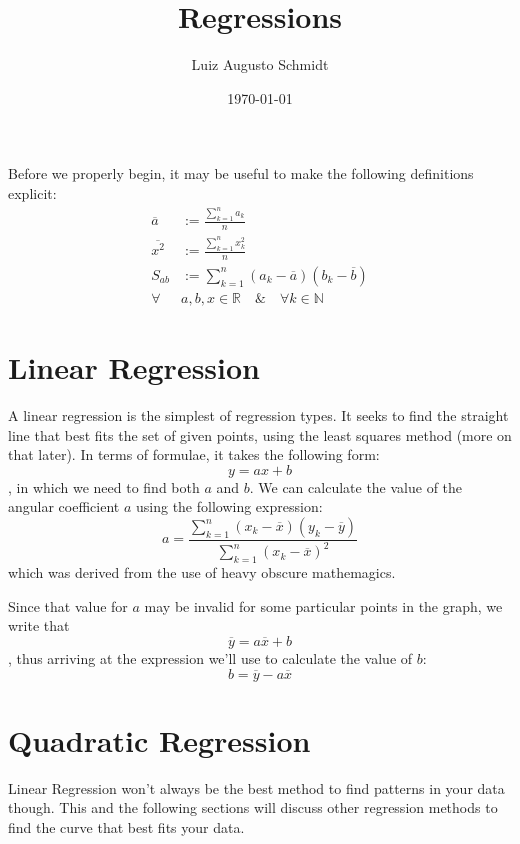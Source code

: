 \documentclass{article}
\title{Regressions}
\author{Luiz Augusto Schmidt}
\date{\today}
\begin{document}
	\maketitle
	Before we properly begin, it may be useful to make the following definitions explicit:
		\begin{equation*}
			\begin{split}
				\overline{a} &:= \frac{\sum_{k=1}^{n} a_{k}}{n} \\
				\overline{x^{2}} &:= \frac{\sum_{k = 1}^{n} x_{k}^{2}}{n} \\
				S_{ab} &:= \sum_{k = 1}^{n}(a_{k} - \overline{a})(b_{k} - \overline{b}) \\
				\forall &a, b, x \in \mathbb{R}  \quad \& \quad \forall k \in \mathbb{N} 
			\end{split}
		\end{equation*}
	\section{Linear Regression}
		A linear regression is the simplest of regression types. It seeks to find the  straight line that best fits the set of given points, using the least squares method (more on that later). In terms of formulae, it takes the following form: \[y = ax + b\], in which we need to find both $a$ and $b$.  We can calculate the value of the angular coefficient $a$ using the following expression: 
		\begin{equation}
			a = \frac{\sum_{k = 1}^{n} (x_{k} - \overline{x})(y_{k} - \overline{y})}{\sum_{k = 1}^{n} (x_{k} - \overline{x})^{2}}
		\end{equation}
		which was derived from the use of heavy obscure mathemagics.
		
		Since that value for $a$ may be invalid for some particular points in the graph, we write that \[\overline{y} = a\overline{x} + b\], thus arriving at the expression we'll use to calculate the value of \(b\):
		\begin{equation}
			b = \overline{y} - a\overline{x}
		\end{equation} 
		
		
	\section{Quadratic Regression}
		Linear Regression won't always be the best method to find patterns in your data though. This and the following sections will discuss other regression methods to find the curve that best fits your data.
		
\end{document}
